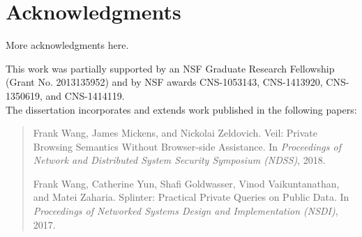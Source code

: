 \chapter*{Acknowledgments}

More acknowledgments here.

\asterism


This work was
partially supported by an NSF Graduate Research Fellowship
(Grant No. 2013135952) and by NSF awards
CNS-1053143, CNS-1413920, CNS-1350619, 
and CNS-1414119. \\

The dissertation incorporates and extends work published
in the following papers:

\begin{quote}

  Frank Wang, James Mickens, and Nickolai Zeldovich.
  \newblock Veil: Private Browsing Semantics Without Browser-side Assistance.
  \newblock In \emph{Proceedings of Network and Distributed System Security Symposium (\mbox{NDSS})},
  2018.
  
  Frank Wang, Catherine Yun, Shafi Goldwasser, Vinod Vaikuntanathan, and Matei Zaharia.
  \newblock Splinter: Practical Private Queries on Public Data.
  \newblock In \emph{Proceedings of Networked Systems Design
  	and Implementation (\mbox{NSDI})}, 2017.
  
\end{quote}
